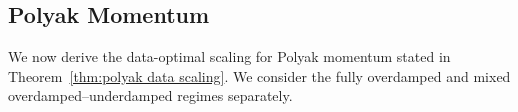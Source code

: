 

\subsection{Polyak Momentum}
\label{app:hb_scaling_analysis}

We now derive the data-optimal scaling for Polyak momentum stated in
Theorem~\ref{thm:polyak data scaling}. We consider the fully overdamped and
mixed overdamped--underdamped regimes separately.

